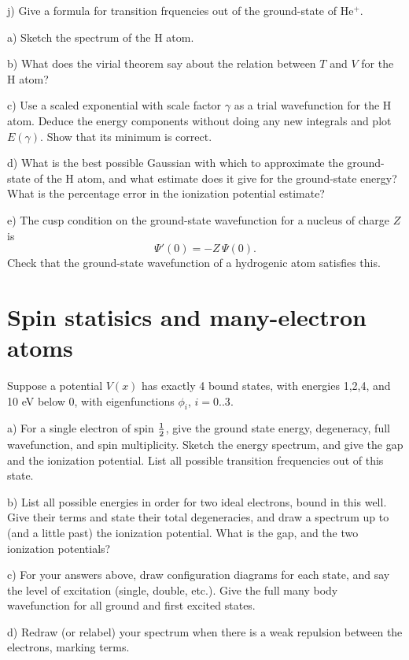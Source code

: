 j) Give a formula for transition frquencies out of the ground-state of He$^+$.

\newpage
{}

a) Sketch the spectrum of the H atom.

b) What does the virial theorem say about the relation between $T$ and $V$ for the 
H atom?

c) Use a scaled exponential with scale factor $\gamma$ as a trial wavefunction for
the H atom.  Deduce the energy components without doing any new integrals and plot
$E(\gamma)$.  Show that its minimum is correct.

d) What is the best possible Gaussian with which to approximate the ground-state
of the H atom, and what estimate does it give for the ground-state energy?  What 
is the percentage error in the ionization potential estimate?

e) The cusp condition on the ground-state wavefunction for a nucleus of charge $Z$ is 
$$\Psi'(0) = - Z\, \Psi(0).$$
Check that the ground-state wavefunction of a hydrogenic atom satisfies this.

\newpage
\part{Spin statisics and many-electron atoms}
\newpage
{}

Suppose a potential $V(x)$ has exactly 4 bound states, with energies 1,2,4, and
10 eV below 0, with eigenfunctions $\phi_i$, $i=0..3$.


a) For a single electron of spin $\frac{1}{2}$, give the ground state energy, degeneracy, full wavefunction, and spin multiplicity.
Sketch the energy spectrum, and give the gap and the ionization potential.  List all possible transition frequencies out
of this state.

b) List all possible energies in order for two ideal electrons, bound in this well.  Give their terms and state their total
degeneracies, and draw a spectrum up to (and a little past) the ionization potential.  What is the gap, and the two ionization
potentials?

c) For your answers above, draw configuration diagrams for each state, and say the level of excitation (single, double, etc.).
Give the full many body wavefunction for all ground and first excited states.

d) Redraw (or relabel) your spectrum when there is a weak repulsion between the electrons, marking terms.

